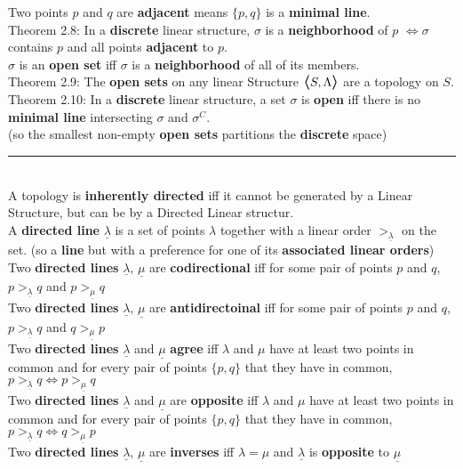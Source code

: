\documentclass{article}
\newcommand{\hsp}[1][5]{\hspace{0.#1 cm}}
\newcommand{\hcm}[1][1]{\hspace{#1 cm}}
\newcommand{\bra}[1][1.2]{\scalebox{#1}{$\boldsymbol{\langle}$}}
\newcommand{\nl}[1][12]{\\[#1pt]}
\newcommand{\ket}[1][1.2]{\scalebox{#1}{$\boldsymbol{\rangle}$}}
\newcommand {\chb}[1]{\textbf{#1}}
\begin{document}
\begin{flushleft}
Two points $p$ and $q$ are \chb{adjacent} means $\{p, q\}$ is a \chb{minimal line}.\nl

\hcm Theorem 2.8: In a \chb{discrete} linear structure, $\sigma$ is a \chb{neighborhood} of $p$ $\iff \sigma$ contains $p$ and all points \chb{adjacent} to $p$.\nl

$\sigma$ is an \chb{open set} iff $\sigma$ is a \chb{neighborhood} of all of its members.\nl

\hcm Theorem 2.9: The \chb{open sets} on any linear Structure  $\bra S, \Lambda\ket$ are a topology on $S$.\nl

\hcm Theorem 2.10: In a \chb{discrete} linear structure, a set $\sigma$ is \chb{open} iff there is no \chb{minimal line} intersecting $\sigma$ and $\sigma^C$.\nl[3]
\hcm (so the smallest non-empty \chb{open sets} partitions the \chb{discrete} space)\nl[10]

\par\noindent\rule{\textwidth}{0.4pt}\nl[5] %

A topology is \chb{inherently directed} iff it cannot be generated by a Linear Structure, but can be by a Directed Linear structur.\nl[10]

A \chb{directed line} $\underline{\lambda}$ is a set of points $\lambda$ together with a linear order $>_{\underline{\lambda}}$ on the set. (so a \chb{line} but with a preference for one of its \chb{associated linear orders})\nl[10]

\hsp[2] Two \chb{directed lines} $\underline{\lambda},\, \underline{\mu}$ are \chb{codirectional} iff for some pair of points $p$ and $q$, $p >_{\underline{\lambda}}q $ and $ p >_{\underline{\mu}}q$\nl[5]
\hsp[2] Two \chb{directed lines} $\underline{\lambda},\, \underline{\mu}$ are \chb{antidirectoinal} iff for some pair of points $p$ and $q$, $p >_{\underline{\lambda}}q $ and $ q >_{\underline{\mu}}p$\nl[5]
\hsp[2] Two \chb{directed lines} $\underline{\lambda}$ and $\underline{\mu}$ \chb{agree} iff $\lambda$ and $\mu$ have at least two points in common and for every pair of points $\{p,q\}$ that they have in common, $p >_{\underline{\lambda}}q \iff p >_{\underline{\mu}}q$\nl[5]
\hsp[2] Two \chb{directed lines} $\underline{\lambda}$ and $\underline{\mu}$ are \chb{opposite} iff $\lambda$ and $\mu$ have at least two points in common and for every pair of points $\{p,q\}$ that they have in common, $p >_{\underline{\lambda}}q \iff q >_{\underline{\mu}}p$\nl[5]
\hsp[2] Two \chb{directed lines} $\underline{\lambda},\, \underline{\mu}$ are \chb{inverses} iff $\lambda = \mu$ and $\underline{\lambda}$ is \chb{opposite} to $\underline{\mu}$\nl[10]


\end{flushleft}
\end{document}
